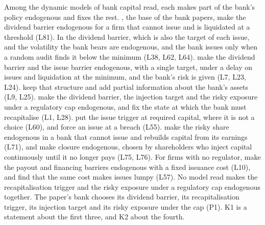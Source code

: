 Among the dynamic models of bank capital read, each makes part of the bank's
policy endogenous and fixes the rest. \citet{milnerobertson1996}, the base of
the bank papers, make the dividend barrier endogenous for a firm that cannot
issue and is liquidated at a threshold (L81). In \citet{milnewhalley2001} the dividend
barrier, which is also the target of each issue, and the volatility the bank
bears are endogenous, and the bank issues only when a random audit finds it
below the minimum (L38, L62, L64). \citet{peura2006} make the dividend barrier
and the issue barrier endogenous, with a single target, under a delay on issues
and liquidation at the minimum, and the bank's risk is given (L7, L23, L24).
\citet{daihuangkeppo2019} keep that structure and add partial information
about the bank's assets (L9, L25). \citet{bayraktar2026} make the dividend
barrier, the injection target and the risky exposure under a regulatory cap
endogenous, and fix the state at which the bank must recapitalise (L1, L28).
\citet{federico2026} put the issue trigger at required capital, where it is
not a choice (L60), and \citet{glover2023} force an issue at a breach (L55).
\citet{calem1999} make the risky share endogenous in a bank that cannot issue
and rebuilds capital from its earnings (L71), and \citet{fries1997} make
closure endogenous, chosen by shareholders who inject capital continuously
until it no longer pays (L75, L76). For firms with no regulator,
\citet{bolton2011} make the payout and financing
barriers endogenous with a fixed issuance cost (L10), and \citet{decamps2011}
find that the same cost makes issues lumpy (L57). No model read makes the
recapitalisation trigger and the risky exposure under a regulatory cap
endogenous together. The paper's bank chooses its dividend barrier, its
recapitalisation trigger, its injection target and its risky exposure under the
cap (P1). K1 is a statement about the first three, and K2 about the fourth.

